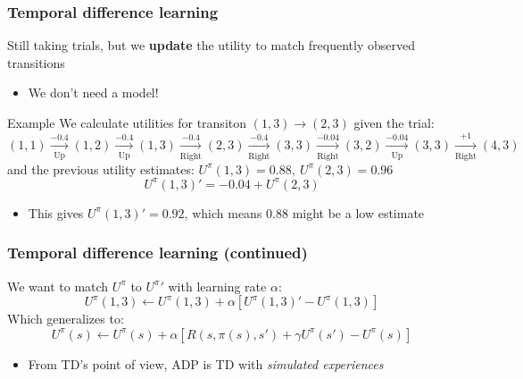 \documentclass{beamer}
\begin{document}
\begin{frame}
	\frametitle{Temporal difference learning}
	Still taking trials, but we \textbf{update} the utility to match frequently observed transitions
	\begin{itemize}
		\item We don't need a model!
	\end{itemize}
	\pause
	\begin{block}{Example}
	We calculate utilities for transiton $(1,3) \rightarrow (2,3)$ given the trial:
		$$
		\scriptstyle
		(1,1) \xrightarrow[\text{Up}]{-0.4} 
		(1,2) \xrightarrow[\text{Up}]{-0.4}
		(1,3) \xrightarrow[\text{Right}]{-0.4}
		(2,3) \xrightarrow[\text{Right}]{-0.4}
		(3,3) \xrightarrow[\text{Right}]{-0.04}
		(3,2) \xrightarrow[\text{Up}]{-0.04}
		(3,3) \xrightarrow[\text{Right}]{+1}
		(4,3)	
	$$
	and the previous utility estimates: $U^\pi(1,3) = 0.88, \ U^\pi(2,3) = 0.96$
	\pause
	$$
		U^\pi (1, 3)' = -0.04 + U^\pi (2,3)
	$$
	\begin{itemize}
		\item This gives $U^\pi(1,3)' = 0.92$, which means $0.88$ might be a low estimate
	\end{itemize}	
	\end{block}
\end{frame}

\begin{frame}
	\frametitle{Temporal difference learning (continued)}
	We want to match $U^\pi$ to $U^\pi'$ with learning rate $\alpha$:
	$$
		U^\pi(1,3) \leftarrow U^\pi(1,3) + \alpha \left[ U^\pi(1,3)' - U^\pi(1,3) \right]
	$$
	Which generalizes to:
	$$
	U^\pi(s) \leftarrow U^\pi(s) + \alpha \left[ R(s, \pi(s), s') + \gamma U^\pi (s') - U^\pi (s) \right]
	$$
	\begin{itemize}
		\item From TD's point of view, ADP is TD with \textit{simulated experiences}
	\end{itemize}
\end{frame}
\end{document}
